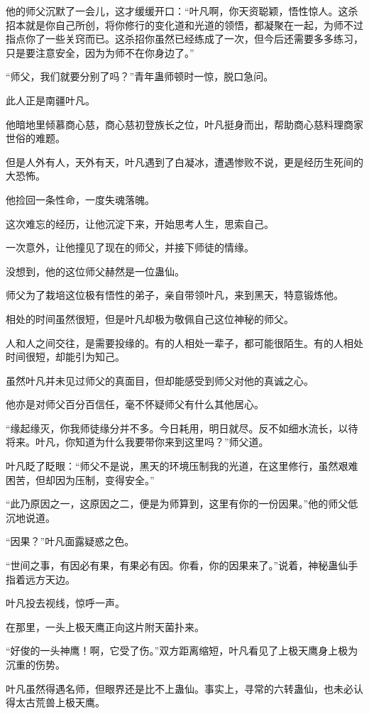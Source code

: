 \begin{this_body}
他的师父沉默了一会儿，这才缓缓开口：“叶凡啊，你天资聪颖，悟性惊人。这杀招本就是你自己所创，将你修行的变化道和光道的领悟，都凝聚在一起，为师不过指点你了一些关窍而已。这杀招你虽然已经练成了一次，但今后还需要多多练习，只是要注意安全，因为为师不在你身边了。”

“师父，我们就要分别了吗？”青年蛊师顿时一惊，脱口急问。

此人正是南疆叶凡。

他暗地里倾慕商心慈，商心慈初登族长之位，叶凡挺身而出，帮助商心慈料理商家世俗的难题。

但是人外有人，天外有天，叶凡遇到了白凝冰，遭遇惨败不说，更是经历生死间的大恐怖。

他捡回一条性命，一度失魂落魄。

这次难忘的经历，让他沉淀下来，开始思考人生，思索自己。

一次意外，让他撞见了现在的师父，并接下师徒的情缘。

没想到，他的这位师父赫然是一位蛊仙。

师父为了栽培这位极有悟性的弟子，亲自带领叶凡，来到黑天，特意锻炼他。

相处的时间虽然很短，但是叶凡却极为敬佩自己这位神秘的师父。

人和人之间交往，是需要投缘的。有的人相处一辈子，都可能很陌生。有的人相处时间很短，却能引为知己。

虽然叶凡并未见过师父的真面目，但却能感受到师父对他的真诚之心。

他亦是对师父百分百信任，毫不怀疑师父有什么其他居心。

“缘起缘灭，你我师徒缘分并不多。今日耗用，明日就尽。反不如细水流长，以待将来。叶凡，你知道为什么我要带你来到这里吗？”师父道。

叶凡眨了眨眼：“师父不是说，黑天的环境压制我的光道，在这里修行，虽然艰难困苦，但却因为压制，变得安全。”

“此乃原因之一，这原因之二，便是为师算到，这里有你的一份因果。”他的师父低沉地说道。

“因果？”叶凡面露疑惑之色。

“世间之事，有因必有果，有果必有因。你看，你的因果来了。”说着，神秘蛊仙手指着远方天边。

叶凡投去视线，惊呼一声。

在那里，一头上极天鹰正向这片附天菌扑来。

“好俊的一头神鹰！啊，它受了伤。”双方距离缩短，叶凡看见了上极天鹰身上极为沉重的伤势。

叶凡虽然得遇名师，但眼界还是比不上蛊仙。事实上，寻常的六转蛊仙，也未必认得太古荒兽上极天鹰。


\end{this_body}
